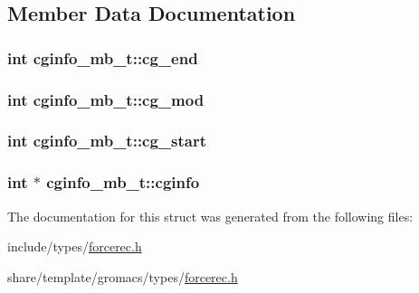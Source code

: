 \subsection{\-Member \-Data \-Documentation}
\hypertarget{structcginfo__mb__t_abf9f41f9e0eb92be25e5e8431d1c3325}{
\subsubsection[{cg\-\_\-end}]{\setlength{\rightskip}{0pt plus 5cm}int {\bf cginfo\-\_\-mb\-\_\-t\-::cg\-\_\-end}}}\label{structcginfo__mb__t_abf9f41f9e0eb92be25e5e8431d1c3325}
\hypertarget{structcginfo__mb__t_a0214e6e020e451ccd0c2b0e5c6b922ae}{
\subsubsection[{cg\-\_\-mod}]{\setlength{\rightskip}{0pt plus 5cm}int {\bf cginfo\-\_\-mb\-\_\-t\-::cg\-\_\-mod}}}\label{structcginfo__mb__t_a0214e6e020e451ccd0c2b0e5c6b922ae}
\hypertarget{structcginfo__mb__t_a110c304812de939d613c4dc274d164e3}{
\subsubsection[{cg\-\_\-start}]{\setlength{\rightskip}{0pt plus 5cm}int {\bf cginfo\-\_\-mb\-\_\-t\-::cg\-\_\-start}}}\label{structcginfo__mb__t_a110c304812de939d613c4dc274d164e3}
\hypertarget{structcginfo__mb__t_ae6e3e38c3174066a4a89046008f23b6f}{
\subsubsection[{cginfo}]{\setlength{\rightskip}{0pt plus 5cm}int $\ast$ {\bf cginfo\-\_\-mb\-\_\-t\-::cginfo}}}\label{structcginfo__mb__t_ae6e3e38c3174066a4a89046008f23b6f}


\-The documentation for this struct was generated from the following files\-:\begin{DoxyCompactItemize}
\item 
include/types/\hyperlink{include_2types_2forcerec_8h}{forcerec.\-h}\item 
share/template/gromacs/types/\hyperlink{share_2template_2gromacs_2types_2forcerec_8h}{forcerec.\-h}\end{DoxyCompactItemize}
